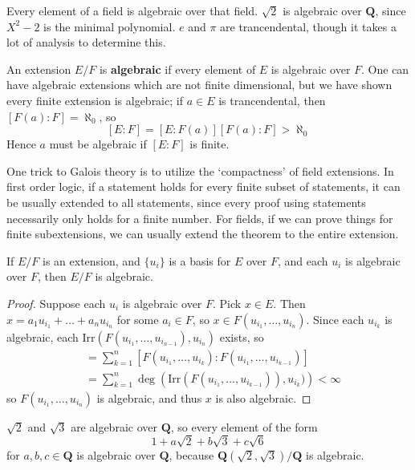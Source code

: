 \begin{example}
    Every element of a field is algebraic over that field. $\sqrt{2}$ is algebraic over $\mathbf{Q}$, since $X^2 - 2$ is the minimal polynomial. $e$ and $\pi$ are trancendental, though it takes a lot of analysis to determine this.
\end{example}

An extension $E/F$ is {\bf algebraic} if every element of $E$ is algebraic over $F$. One can have algebraic extensions which are not finite dimensional, but we have shown every finite extension is algebraic; if $a \in E$ is trancendental, then $[F(a): F] = \aleph_0$, so
%
\[ [E:F] = [E:F(a)][F(a):F] > \aleph_0 \]
%
Hence $a$ must be algebraic if $[E:F]$ is finite.

One trick to Galois theory is to utilize the `compactness' of field extensions. In first order logic, if a statement holds for every finite subset of statements, it can be usually extended to all statements, since every proof using statements necessarily only holds for a finite number. For fields, if we can prove things for finite subextensions, we can usually extend the theorem to the entire extension.

\begin{theorem}
    If $E/F$ is an extension, and $\{ u_i \}$ is a basis for $E$ over $F$, and each $u_i$ is algebraic over $F$, then $E/F$ is algebraic.
\end{theorem}
\begin{proof}
    Suppose each $u_i$ is algebraic over $F$. Pick $x \in E$. Then $x = a_1 u_{i_1} + \dots + a_n u_{i_n}$ for some $a_i \in F$, so $x \in F(u_{i_1}, \dots, u_{i_n})$. Since each $u_{i_k}$ is algebraic, each $\text{Irr}(F(u_{i_1}, \dots, u_{i_{n-1}}), u_{i_n})$ exists, so
    \begin{align*}
        [F(u_{i_1}, \dots, u_{i_n}): F] &= \sum_{k = 1}^n \left[F(u_{i_1}, \dots, u_{i_k}): F(u_{i_1}, \dots, u_{i_{k-1}})\right]\\
        &= \sum_{k = 1}^n \deg\left(\text{Irr}\left(F(u_{i_1}, \dots, u_{i_{k-1}})\right), u_{i_k})\right) < \infty
    \end{align*}
    so $F(u_{i_1}, \dots, u_{i_n})$ is algebraic, and thus $x$ is also algebraic.
\end{proof}

\begin{example}
    $\sqrt{2}$ and $\sqrt{3}$ are algebraic over $\mathbf{Q}$, so every element of the form
    \[ 1 + a \sqrt{2} + b \sqrt{3} + c \sqrt{6} \]
    for $a,b,c \in \mathbf{Q}$ is algebraic over $\mathbf{Q}$, because $\mathbf{Q}(\sqrt{2},\sqrt{3})/\mathbf{Q}$ is algebraic.
\end{example}

